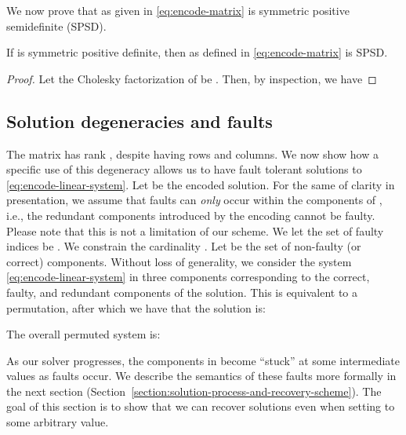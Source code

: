 \documentclass[11pt]{article}
\begin{document}
We now prove that  as given in \eqref{eq:encode-matrix} is symmetric positive semidefinite (SPSD).
\begin{proposition}
If  is symmetric positive definite, then  as defined in \eqref{eq:encode-matrix} is SPSD.
\label{prop:encode-matrix-SPD}
\end{proposition}
\begin{proof}
Let the Cholesky factorization of  be . Then, by inspection, we have 

\end{proof}

\subsection{Solution degeneracies and faults}

The matrix  has rank , despite having  rows and columns.
We now show how a specific use of this degeneracy allows us to have fault tolerant
solutions to \eqref{eq:encode-linear-system}. Let  be the
encoded solution. For the same of clarity in presentation, we assume that faults can
\textit{only} occur within the components of , i.e., the redundant
components  introduced by the encoding cannot be faulty.
Please note that this is not a limitation of our scheme.
We let the set of faulty indices be . We constrain the
cardinality . Let  be the set of non-faulty (or correct)
components. Without loss of generality, we consider the system
\eqref{eq:encode-linear-system} in three components corresponding to the correct,
faulty, and redundant components of the solution. This is equivalent to a permutation,
after which we have that the solution is:

The overall permuted system is: 

As our solver progresses, the components in  become ``stuck'' at some
intermediate values as faults occur. We describe the semantics of these faults
more formally in the next section (Section~\ref{section:solution-process-and-recovery-scheme}).
The goal of this section is to show that we can recover solutions even when setting
 to some arbitrary value.
\end{document}
